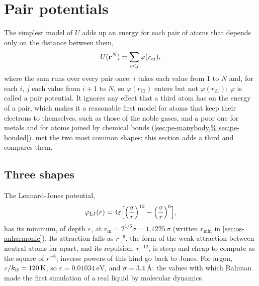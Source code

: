 \section{Pair potentials}
\label{sec:pe-pairs}

The simplest model of $U$ adds up an energy for each pair of atoms that
depends only on the distance between them,
\begin{equation}
   U(\bm{\mathrm{r}}^N) = \sum_{i<j}\varphi(r_{ij}) ,
   \label{eq:pe-pair-sum}
\end{equation}
where the sum runs over every pair once: $i$ takes each value from 1 to
$N$ and, for each $i$, $j$ each value from $i + 1$ to $N$, so
$\varphi(r_{12})$ enters but not $\varphi(r_{21})$; $\varphi$ is called a
pair potential. It ignores any effect that a third atom has on the
energy of a pair, which makes it a reasonable first model for atoms that
keep their electrons to themselves, such as those of the noble gases, and a poor one
for metals and for atoms joined by chemical bonds (\cref{sec:pe-manybody,%
sec:pe-bonded}).  met the two most common shapes;
this section adds a third and compares them.

\subsection*{Three shapes}

The Lennard-Jones potential,
\begin{equation*}
   \varphi_{\mathrm{LJ}}(r) = 4\varepsilon\Bigl[\Bigl(\frac{\sigma}{r}
   \Bigr)^{12} - \Bigl(\frac{\sigma}{r}\Bigr)^6\Bigr] ,
\end{equation*}
has its minimum, of depth $\varepsilon$, at $r_{\mathrm m} =
2^{1/6}\sigma = 1.1225\,\sigma$ (written $r_{\min}$ in
\cref{sec:os-anharmonic}). Its attraction
falls as $r^{-6}$, the form of the weak attraction between neutral atoms
far apart, and its repulsion, $r^{-12}$, is steep and cheap to compute as
the square of $r^{-6}$; inverse powers of this kind go back to
Jones\cite{Jones1924}. For argon, $\varepsilon/k_{\mathrm{B}} = \SI{120}{\kelvin}$,
so $\varepsilon = \SI{0.01034}{\electronvolt}$, and $\sigma =
\SI{3.4}{\angstrom}$: the values with which Rahman made the first
simulation of a real liquid by molecular dynamics\cite{Rahman1964}.

